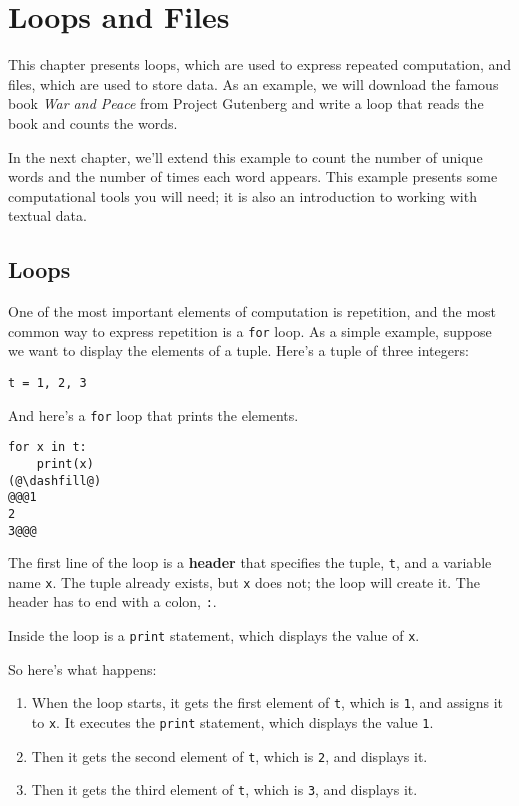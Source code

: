 \hypertarget{loops-and-files}{%
\chapter{Loops and Files}\label{loops-and-files}}

This chapter presents loops, which are used to express repeated
computation, and files, which are used to store data. As an example, we
will download the famous book \emph{War and Peace} from Project
Gutenberg and write a loop that reads the book and counts the words.

In the next chapter, we'll extend this example to count the number of
unique words and the number of times each word appears. This example
presents some computational tools you will need; it is also an
introduction to working with textual data.

\hypertarget{loops}{%
\section{Loops}\label{loops}}

One of the most important elements of computation is repetition, and the
most common way to express repetition is a \passthrough{\lstinline!for!}
loop. As a simple example, suppose we want to display the elements of a
tuple. Here's a tuple of three integers:

\begin{lstlisting}[]
t = 1, 2, 3
\end{lstlisting}

And here's a \passthrough{\lstinline!for!} loop that prints the
elements.

\begin{lstlisting}[]
for x in t:
    print(x)
(@\dashfill@)
@@@1
2
3@@@
\end{lstlisting}

The first line of the loop is a \textbf{header} that specifies the
tuple, \passthrough{\lstinline!t!}, and a variable name
\passthrough{\lstinline!x!}. The tuple already exists, but
\passthrough{\lstinline!x!} does not; the loop will create it. The
header has to end with a colon, \passthrough{\lstinline!:!}.

Inside the loop is a \passthrough{\lstinline!print!} statement, which
displays the value of \passthrough{\lstinline!x!}.

So here's what happens:

\begin{enumerate}
\def\labelenumi{\arabic{enumi}.}
\item
  When the loop starts, it gets the first element of
  \passthrough{\lstinline!t!}, which is \passthrough{\lstinline!1!}, and
  assigns it to \passthrough{\lstinline!x!}. It executes the
  \passthrough{\lstinline!print!} statement, which displays the value
  \passthrough{\lstinline!1!}.
\item
  Then it gets the second element of \passthrough{\lstinline!t!}, which
  is \passthrough{\lstinline!2!}, and displays it.
\item
  Then it gets the third element of \passthrough{\lstinline!t!}, which
  is \passthrough{\lstinline!3!}, and displays it.
\end{enumerate}

